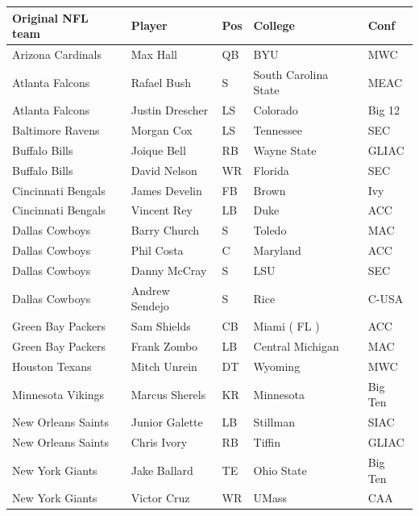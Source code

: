 \documentclass{article}
\begin{document}
\begin{tabular}{lllll}
\toprule
Original NFL team & Player & Pos & College & Conf \\
\midrule
Arizona Cardinals & Max Hall & QB & BYU & MWC \\
Atlanta Falcons & Rafael Bush & S & South Carolina State & MEAC \\
Atlanta Falcons & Justin Drescher & LS & Colorado & Big 12 \\
Baltimore Ravens & Morgan Cox & LS & Tennessee & SEC \\
Buffalo Bills & Joique Bell & RB & Wayne State & GLIAC \\
Buffalo Bills & David Nelson & WR & Florida & SEC \\
Cincinnati Bengals & James Develin & FB & Brown & Ivy \\
Cincinnati Bengals & Vincent Rey & LB & Duke & ACC \\
Dallas Cowboys & Barry Church & S & Toledo & MAC \\
Dallas Cowboys & Phil Costa & C & Maryland & ACC \\
Dallas Cowboys & Danny McCray & S & LSU & SEC \\
Dallas Cowboys & Andrew Sendejo & S & Rice & C-USA \\
Green Bay Packers & Sam Shields & CB & Miami ( FL ) & ACC \\
Green Bay Packers & Frank Zombo & LB & Central Michigan & MAC \\
Houston Texans & Mitch Unrein & DT & Wyoming & MWC \\
Minnesota Vikings & Marcus Sherels & KR & Minnesota & Big Ten \\
New Orleans Saints & Junior Galette & LB & Stillman & SIAC \\
New Orleans Saints & Chris Ivory & RB & Tiffin & GLIAC \\
New York Giants & Jake Ballard & TE & Ohio State & Big Ten \\
New York Giants & Victor Cruz & WR & UMass & CAA \\
\bottomrule
\end{tabular}
\end{document}
